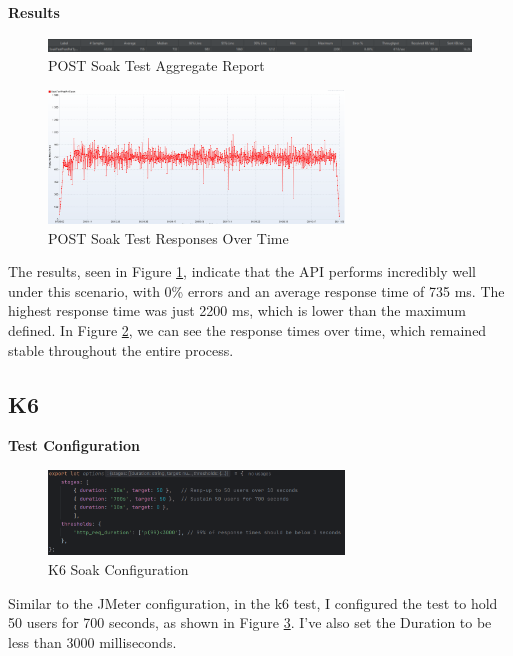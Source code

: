 \documentclass[a4paper,11pt,openright,BCOR=15mm]{scrbook}
\begin{document}
		  
		  
		  \textbf{Results}

		  \begin{figure}[H]
			\centering
			\includegraphics[width=\textwidth]{figs/Performance/Results/JMETER POST SOAK AR.png}
			\caption{POST Soak Test Aggregate Report}
			\label{fig:POSTSoakAggregateReport}
		\end{figure}
		\begin{figure}[H]
			\centering
			\includegraphics[width=0.7\textwidth]{figs/Performance/Results/JMETER POST SOAK ROT.png}
			\caption{POST Soak Test Responses Over Time}
			\label{fig:POSTSoakResposesOverTime}
		\end{figure}

		The results, seen in Figure \ref{fig:POSTSoakAggregateReport}, indicate that the API performs incredibly well under this scenario, with 0\% errors and an average response time of 735 ms. The highest response time was just 2200 ms, which is lower than the maximum defined.
		In Figure \ref{fig:POSTSoakResposesOverTime}, we can see the response times over time, which remained stable throughout the entire process.


		  \subsection{K6}
		  \textbf{Test Configuration}
		\begin{figure}[H]
			\centering
			\includegraphics[width=0.7\textwidth]{figs/Performance/Test Configuration/K6-SOAK.png}
			\caption{K6 Soak Configuration}
			\label{fig:K6-Soak-POST}
		\end{figure}
		Similar to the JMeter configuration, in the k6 test, I configured the test to hold 50 users for 700 seconds, as shown in Figure \ref{fig:K6-Soak-POST}. I've also set the Duration to be less than 3000 milliseconds.
\end{document}
